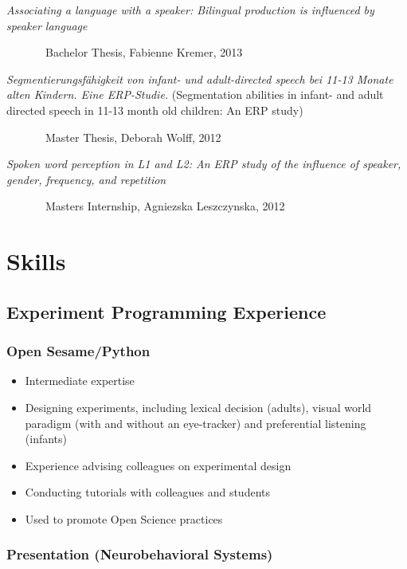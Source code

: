 \documentclass[10pt,a4paper,]{article}
\providecommand{\tightlist}{%
  \setlength{\itemsep}{0pt}\setlength{\parskip}{0pt}}
\begin{document}
\emph{Associating a language with a speaker: Bilingual production is influenced by speaker language}

~~~~~~~Bachelor Thesis, Fabienne Kremer, 2013

\emph{Segmentierungsfähigkeit von infant- und adult-directed speech bei 11-13 Monate alten Kindern. Eine ERP-Studie.} (Segmentation abilities in infant- and adult directed speech in 11-13 month old children: An ERP study)

~~~~~~~Master Thesis, Deborah Wolff, 2012

\emph{Spoken word perception in L1 and L2: An ERP study of the influence of speaker, gender, frequency, and repetition}

~~~~~~~Masters Internship, Agniezska Leszczynska, 2012

\hypertarget{skills}{%
\section{Skills}\label{skills}}

\hypertarget{experiment-programming-experience}{%
\subsection{Experiment Programming Experience}\label{experiment-programming-experience}}

\hypertarget{open-sesamepython}{%
\subsubsection{Open Sesame/Python}\label{open-sesamepython}}

\begin{itemize}
\tightlist
\item
  Intermediate expertise
\item
  Designing experiments, including lexical decision (adults), visual world paradigm (with and without an eye-tracker) and preferential listening (infants)
\item
  Experience advising colleagues on experimental design
\item
  Conducting tutorials with colleagues and students
\item
  Used to promote Open Science practices
\end{itemize}

\hypertarget{presentation-neurobehavioral-systems}{%
\subsubsection{Presentation (Neurobehavioral Systems)}\label{presentation-neurobehavioral-systems}}
\end{document}
